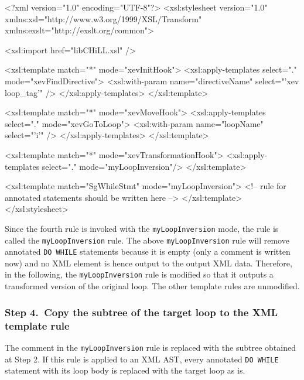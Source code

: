 \begin{framed}
\begin{src}
<?xml version="1.0" encoding="UTF-8"?>
<xsl:stylesheet version="1.0"
		xmlns:xsl="http://www.w3.org/1999/XSL/Transform"
		xmlns:exslt="http://exslt.org/common">

  <xsl:import href="libCHiLL.xsl" />

  <xsl:template match="*" mode="xevInitHook">
   <xsl:apply-templates select="." mode="xevFindDirective">
      <xsl:with-param name="directiveName" select="'xev loop_tag'" />
    </xsl:apply-templates>
  </xsl:template>

  <xsl:template match="*" mode="xevMoveHook">
    <xsl:apply-templates select="." mode="xevGoToLoop">
      <xsl:with-param name="loopName" select="'i'" />
    </xsl:apply-templates>
  </xsl:template>

  <xsl:template match="*" mode="xevTransformationHook">
    <xsl:apply-templates select="." mode="myLoopInversion"/>
  </xsl:template>

  <xsl:template match="SgWhileStmt" mode="myLoopInversion">
    <!-- rule for annotated statements should be written here -->
  </xsl:template>
</xsl:stylesheet>
\end{src}
\end{framed}


Since the fourth rule is invoked with the \texttt{myLoopInversion} mode,
the rule is called the \texttt{myLoopInversion} rule.  The above
\texttt{myLoopInversion} rule will remove annotated \texttt{DO WHILE}
statements because it is empty (only a comment is written now) and no
XML element is hence output to the output XML data. Therefore, in the
following, the \texttt{myLoopInversion} rule is modified so that it
outputs a transformed version of the original loop. The other template
rules are unmodified.

\subsubsection*{Step 4.~Copy the subtree of the target loop to the XML template rule}

The comment in the \texttt{myLoopInversion} rule is replaced with the
subtree obtained at Step 2.  If this rule is applied to an XML AST,
every annotated \texttt{DO WHILE} statement with its loop body is
replaced with the target loop as is.

